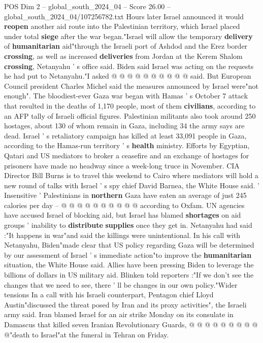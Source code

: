 \begin{textsample}{POS Dim 2 – global\_south\_2024\_04 – Score 26.00 – global\_south\_2024\_04/107256782.txt}
Hours later Israel announced it would \textbf{reopen} another aid route into the Palestinian territory, which Israel placed under total \textbf{siege} after the war began."Israel will allow the temporary \textbf{delivery} of \textbf{humanitarian} aid"through the Israeli port of Ashdod and the Erez border \textbf{crossing}, as well as increased \textbf{deliveries} from Jordan at the Kerem Shalom \textbf{crossing}, Netanyahu ' s office said.
Biden said Israel was acting on the requests he had put to Netanyahu."I asked @ @ @ @ @ @ @ @ @ @ said.
But European Council president Charles Michel said the measures announced by Israel were"not enough".
The bloodiest-ever Gaza war began with Hamas ' s October 7 attack that resulted in the deaths of 1,170 people, most of them \textbf{civilians}, according to an AFP tally of Israeli official figures.
Palestinian militants also took around 250 hostages, about 130 of whom remain in Gaza, including 34 the army says are dead.
Israel ' s retaliatory campaign has killed at least 33,091 people in Gaza, according to the Hamas-run territory ' s \textbf{health} ministry.
Efforts by Egyptian, Qatari and US mediators to broker a ceasefire and an exchange of hostages for prisoners have made no headway since a week-long truce in November.
CIA Director Bill Burns is to travel this weekend to Cairo where mediators will hold a new round of talks with Israel ' s spy chief David Barnea, the White House said. ' Insensitive ' Palestinians in \textbf{northern} Gaza have eaten an average of just 245 calories per day -- @ @ @ @ @ @ @ @ @ @ according to Oxfam.
UN agencies have accused Israel of blocking aid, but Israel has blamed \textbf{shortages} on aid groups ' inability to \textbf{distribute} \textbf{supplies} once they get in.
Netanyahu had said :"It happens in war"and said the killings were unintentional.
In his call with Netanyahu, Biden"made clear that US policy regarding Gaza will be determined by our assessment of Israel ' s immediate action"to improve the \textbf{humanitarian} situation, the White House said.
Allies have been pressing Biden to leverage the billions of dollars in US military aid.
Blinken told reporters :"If we don't see the changes that we need to see, there ' ll be changes in our own policy."Wider tensions In a call with his Israeli counterpart, Pentagon chief Lloyd Austin"discussed the threat posed by Iran and its proxy activities", the Israeli army said.
Iran blamed Israel for an air strike Monday on its consulate in Damascus that killed seven Iranian Revolutionary Guards, @ @ @ @ @ @ @ @ @ @"death to Israel"at the funeral in Tehran on Friday.

\end{textsample}

